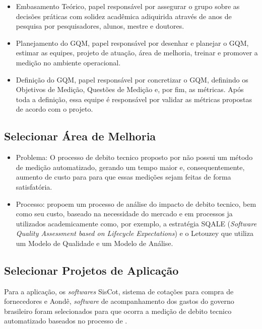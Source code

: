 \begin{itemize}
  \item Embasamento Teórico, papel responsável por assegurar o grupo sobre as decisões
  práticas com solidez acadêmica adiquirida através de anos de pesquisa por pesquisadores,
  alunos, mestre e doutores.

  \item Planejamento do GQM, papel responsável por desenhar e planejar o GQM, estimar
  as equipes, projeto de atuação, área de melhoria, treinar e promover a medição
  no ambiente operacional.

  \item Definição do GQM, papel responsável por concretizar o GQM, definindo os
  Objetivos de Medição, Questões de Medição e, por fim, as métricas. Após toda a
  definição, essa equipe é responsável por validar as métricas propostas de acordo
  com o projeto.

\end{itemize}

\subsection{Selecionar Área de Melhoria}
\begin{itemize}
  \item Problema: O processo de debito tecnico proposto por  \cite{td} não possui
  um método de medição automatizado, gerando um tempo maior e, consequentemente, aumento de custo
  para para que essas medições sejam feitas de forma satisfatória.

  \item Processo: \cite{td} propoem um processo de análise do impacto de debito tecnico,
  bem como seu custo, baseado na necessidade do mercado e em processos ja utilizados academicamente como,
  por exemplo, a estratégia SQALE (\textit{Software Quality Assessment based on Lifecycle Expectations}) e o
  Letouzey que utiliza um Modelo de Qualidade e um Modelo de Análise.
\end{itemize}

\subsection{Selecionar Projetos de Aplicação}
Para a aplicação, os \textit{softwares} SisCot, sistema de cotações para compra de fornecedores e Aondê, \textit{software}
de acompanhamento dos gastos do governo brasileiro foram selecionados para que ocorra a medição
de debito tecnico automatizado baseados no processo de \cite{td}.

